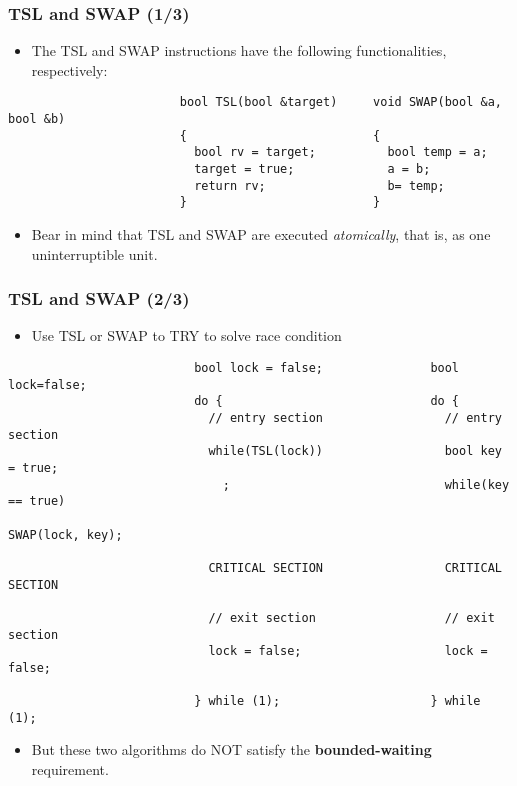 \documentclass[CJKutf8,dvipsnames,table]{beamer}
\begin{document}
\begin{CJK*}{UTF8}{song}
  \begin{frame}[fragile]
  \frametitle{TSL and SWAP (1/3)} \pause
  \begin{itemize}
  \item{The TSL and SWAP instructions have the following functionalities, respectively:} \pause
  \end{itemize}

\begin{lstlisting}
						bool TSL(bool &target)     void SWAP(bool &a, bool &b)
						{                          {
						  bool rv = target;          bool temp = a;
						  target = true;             a = b;
						  return rv;                 b= temp;
						}                          }
\end{lstlisting}

  \pause

  \begin{itemize}
  \item{Bear in mind that TSL and SWAP are executed \emph{atomically}, that is, as one uninterruptible unit.}
  \end{itemize}
\end{frame}

  \begin{frame}[fragile]
  \frametitle{TSL and SWAP (2/3)} \pause
  \begin{itemize}
  \item{Use TSL or SWAP to TRY to solve race condition} \pause
  \end{itemize}

\begin{lstlisting}
						  bool lock = false;               bool lock=false;
						  do {                             do {
						    // entry section                 // entry section
						    while(TSL(lock))                 bool key = true;
						      ;                              while(key == true)
						                                       SWAP(lock, key);

						    CRITICAL SECTION                 CRITICAL SECTION

						    // exit section                  // exit section
						    lock = false;                    lock = false;

						  } while (1);                     } while (1);
\end{lstlisting}

  \pause

  \begin{itemize}
  \item{But these two algorithms do NOT satisfy the \textbf{bounded-waiting} requirement.}
  \end{itemize}
\end{frame}


\end{CJK*}
\end{document}
